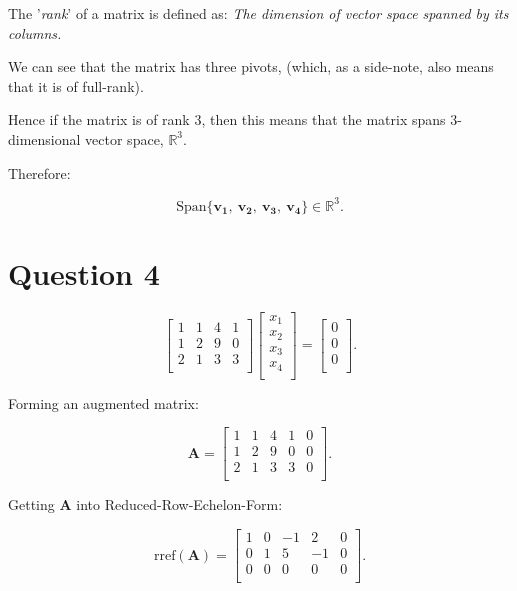 \documentclass{article}
\begin{document}
The '\textit{rank}' of a matrix is defined as: \textit{The dimension of vector space spanned
by its columns.}

We can see that the matrix has three pivots, (which, as a side-note, also means that it is of full-rank).

Hence if the matrix is of rank 3, then this means that the matrix spans
3-dimensional vector space, $\mathbb{R}^{3}$.

Therefore: 

\[
    \text{Span} \{
    \mathbf{v_1},\
    \mathbf{v_2},\
    \mathbf{v_3},\
    \mathbf{v_4} \} 
    \in 
    \mathbb{R}^{3}
.\]


\clearpage
\section{Question 4}
\[
\begin{bmatrix}
    1 & 1 & 4 & 1 \\
    1 & 2 & 9 & 0 \\
    2 & 1 & 3 & 3 \\
\end{bmatrix}
\begin{bmatrix}
    x_1 \\ x_2 \\ x_3 \\ x_4 \\
\end{bmatrix}
=
\begin{bmatrix}
    0 \\ 0 \\ 0 \\
\end{bmatrix}
.\]


Forming an augmented matrix:


\[
    \mathbf{A} 
    = 
    \begin{bmatrix}
        1 & 1 & 4 & 1 & 0 \\
        1 & 2 & 9 & 0 & 0 \\
        2 & 1 & 3 & 3 & 0 \\
    \end{bmatrix}
.\]


Getting $\mathbf{A}$ into Reduced-Row-Echelon-Form:


\[
    \text{rref}(\mathbf{A})
    = 
    \begin{bmatrix}
        1 & 0 &-1 & 2 & 0 \\
        0 & 1 & 5 &-1 & 0 \\
        0 & 0 & 0 & 0 & 0 \\
    \end{bmatrix}
.\]
\end{document}
